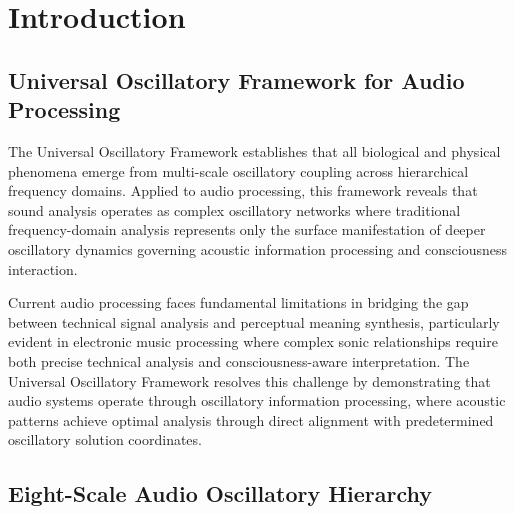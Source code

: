\documentclass[12pt,a4paper]{article}
\begin{document}
\section{Introduction}

\subsection{Universal Oscillatory Framework for Audio Processing}

The Universal Oscillatory Framework establishes that all biological and physical phenomena emerge from multi-scale oscillatory coupling across hierarchical frequency domains. Applied to audio processing, this framework reveals that sound analysis operates as complex oscillatory networks where traditional frequency-domain analysis represents only the surface manifestation of deeper oscillatory dynamics governing acoustic information processing and consciousness interaction.

Current audio processing faces fundamental limitations in bridging the gap between technical signal analysis and perceptual meaning synthesis, particularly evident in electronic music processing where complex sonic relationships require both precise technical analysis and consciousness-aware interpretation. The Universal Oscillatory Framework resolves this challenge by demonstrating that audio systems operate through oscillatory information processing, where acoustic patterns achieve optimal analysis through direct alignment with predetermined oscillatory solution coordinates.

\subsection{Eight-Scale Audio Oscillatory Hierarchy}
\end{document}
